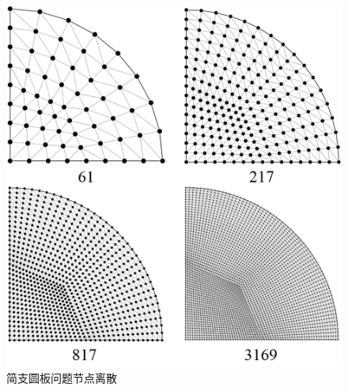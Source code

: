 \begin{figure}[H]
    \centering 
        \includegraphics[scale=0.5]{figures/shearlocking/yuanplatemsh.png}
        \caption{简支圆板问题节点离散}\label{yuanplatemsh}
\end{figure}
